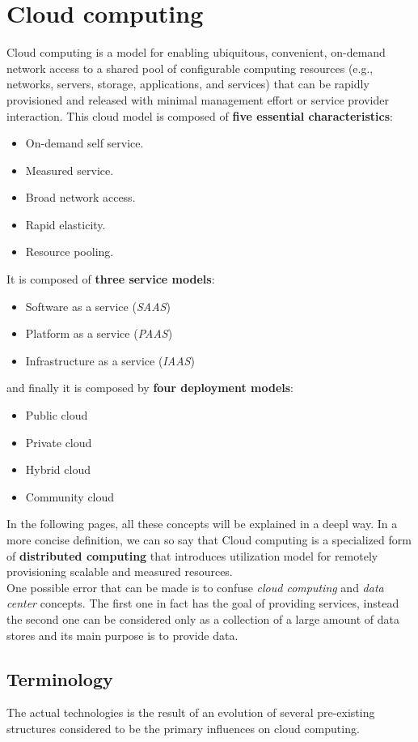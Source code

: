 \section{Cloud computing}
Cloud computing is a model for enabling ubiquitous, convenient, on-demand network access to a shared pool of configurable computing resources (e.g., networks, servers, storage, applications, and services) that can be rapidly provisioned and released with minimal management effort or service provider interaction. This cloud model is composed of \textbf{five essential characteristics}:
\begin{itemize}
	\item On-demand self service.
	\item Measured service.
	\item Broad network access.
	\item Rapid elasticity.
	\item Resource pooling.
\end{itemize}
It is composed of \textbf{three service models}:
\begin{itemize}
	\item Software as a service (\textit{SAAS})
	\item Platform as a service (\textit{PAAS})
	\item Infrastructure as a service (\textit{IAAS})
\end{itemize}
and finally it is composed by \textbf{four deployment models}:
\begin{itemize}
	\item Public cloud
	\item Private cloud
	\item Hybrid cloud
	\item Community cloud
\end{itemize}
In the following pages, all these concepts will be explained in a deepl way. In a more concise definition, we can so say that Cloud computing is a specialized form of \textbf{distributed computing} that introduces utilization model for remotely provisioning scalable and measured resources.\\
One possible error that can be made is to confuse \textit{cloud computing} and \textit{data center} concepts. The first one in fact has the goal of providing services, instead the second one can be considered only as a collection of a large amount of data stores and its main purpose is to provide data.

\subsection{Terminology}
The actual technologies is the result of an evolution of several pre-existing structures considered to be the primary influences on cloud computing.

